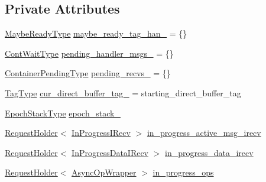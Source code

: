 \subsection*{Private Attributes}
\begin{DoxyCompactItemize}
\item 
\hyperlink{structvt_1_1messaging_1_1_active_messenger_a745d5e8cad8c2f67d20479afacc6e134}{Maybe\+Ready\+Type} \hyperlink{structvt_1_1messaging_1_1_active_messenger_a2db0ef8babe408d23a62518bd0ff180b}{maybe\+\_\+ready\+\_\+tag\+\_\+han\+\_\+} = \{\}
\item 
\hyperlink{structvt_1_1messaging_1_1_active_messenger_a1c52f4ec0c93821191cb3e69dc7c8604}{Cont\+Wait\+Type} \hyperlink{structvt_1_1messaging_1_1_active_messenger_aae19c8a01b0c483f20d58bd9114cac0e}{pending\+\_\+handler\+\_\+msgs\+\_\+} = \{\}
\item 
\hyperlink{structvt_1_1messaging_1_1_active_messenger_a388e97eeb72592e57551e045b43bcfde}{Container\+Pending\+Type} \hyperlink{structvt_1_1messaging_1_1_active_messenger_a77b9f9e025e09d85ba39262e523599b8}{pending\+\_\+recvs\+\_\+} = \{\}
\item 
\hyperlink{namespacevt_a84ab281dae04a52a4b243d6bf62d0e52}{Tag\+Type} \hyperlink{structvt_1_1messaging_1_1_active_messenger_a9a85ff32f58ff99db2c89da92e9c8443}{cur\+\_\+direct\+\_\+buffer\+\_\+tag\+\_\+} = starting\+\_\+direct\+\_\+buffer\+\_\+tag
\item 
\hyperlink{structvt_1_1messaging_1_1_active_messenger_a746358029c37dabf2b4c8ad26642aee9}{Epoch\+Stack\+Type} \hyperlink{structvt_1_1messaging_1_1_active_messenger_a477f7599bd71cba2865e49f3610e6025}{epoch\+\_\+stack\+\_\+}
\item 
\hyperlink{structvt_1_1messaging_1_1_request_holder}{Request\+Holder}$<$ \hyperlink{structvt_1_1messaging_1_1_in_progress_i_recv}{In\+Progress\+I\+Recv} $>$ \hyperlink{structvt_1_1messaging_1_1_active_messenger_aecb78cf16379a90416dd5c78dcc0ec65}{in\+\_\+progress\+\_\+active\+\_\+msg\+\_\+irecv}
\item 
\hyperlink{structvt_1_1messaging_1_1_request_holder}{Request\+Holder}$<$ \hyperlink{structvt_1_1messaging_1_1_in_progress_data_i_recv}{In\+Progress\+Data\+I\+Recv} $>$ \hyperlink{structvt_1_1messaging_1_1_active_messenger_a484829c30624563c7157614849a58d37}{in\+\_\+progress\+\_\+data\+\_\+irecv}
\item 
\hyperlink{structvt_1_1messaging_1_1_request_holder}{Request\+Holder}$<$ \hyperlink{structvt_1_1messaging_1_1_async_op_wrapper}{Async\+Op\+Wrapper} $>$ \hyperlink{structvt_1_1messaging_1_1_active_messenger_a2f3fd6978007e5740861bd05c28dd588}{in\+\_\+progress\+\_\+ops}

\end{DoxyCompactItemize}
